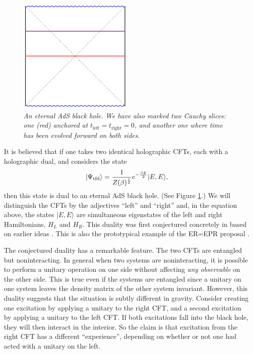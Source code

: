 \documentclass[12pt]{article}
\newcommand{\tfd}{\Psi_{\text{tfd}}} %
\newcommand{\be}{\begin{equation}}
\newcommand{\ee}{\end{equation}}
\begin{document}
\begin{figure}[!ht]
\begin{center}
\includegraphics[width=0.5\textwidth]{eternalbh.pdf}
\caption{\em An eternal AdS black hole. We have also marked two Cauchy slices: one (red) anchored at $t_{\text{left}} = t_{\text{right}} = 0$, and another one where time has been evolved forward on both sides. \label{figeternal}}
\end{center}
\end{figure}
It is believed that if one takes two identical holographic CFTs,  each with a holographic dual, and considers the state
\be
\label{thermofielddefn}
|\tfd \rangle = {1 \over Z(\beta)^{1 \over 2}} e^{-{\beta E \over 2}} |E, E \rangle,
\ee
then this state is dual to an eternal AdS black hole. (See Figure \ref{figeternal}.) We will distinguish the CFTs by the adjectives ``left'' and ``right'' and, in the equation above, the states $|E, E \rangle$ are simultaneous eigenstates of the left and right Hamiltonians, $H_L$ and $H_R$. This duality was first conjectured concretely in \cite{Maldacena:2001kr} based on earlier ideas \cite{Israel:1976ur}. This is also the prototypical example of the ER=EPR proposal \cite{Maldacena:2013xja}. 

The conjectured duality has a remarkable feature.  The two CFTs are entangled but noninteracting. In general when two systems are noninteracting, it is possible to perform a unitary operation on one side without affecting {\em any observable} on the other side. This is true even if the systems 
are entangled since a unitary on one system leaves the density matrix of the other system invariant. However, this duality suggests that the situation is subtly  different in gravity. Consider creating one excitation by applying a unitary to the right CFT, and a second excitation by applying a unitary to the left CFT. If both excitations fall into the black hole, they will then interact in the interior. So the claim is that excitation from the right CFT has a different ``experience'', depending on whether or not one had acted with a unitary on the left. 
\end{document}
